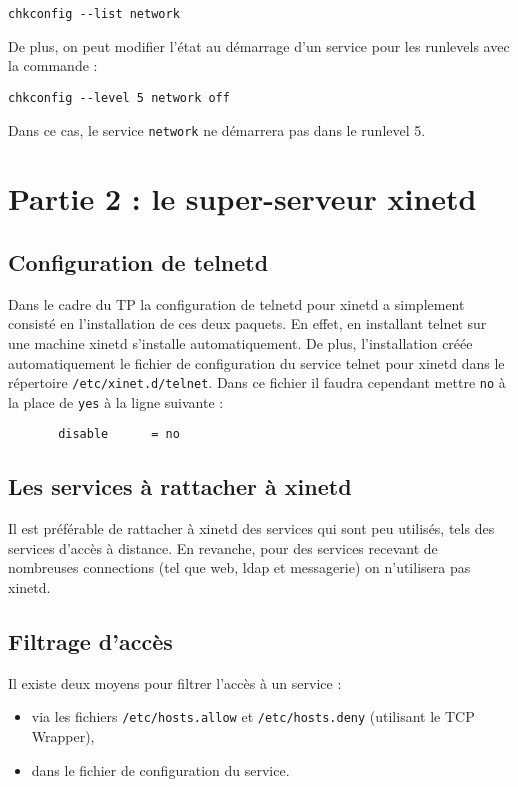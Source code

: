 \documentclass[12pt,a4paper,notitlepage]{article}
\begin{document}
\begin{lstlisting}
chkconfig --list network
\end{lstlisting}
De plus, on peut modifier l'état au démarrage d'un service pour les runlevels avec la commande :
\begin{lstlisting}
chkconfig --level 5 network off
\end{lstlisting}
Dans ce cas, le service \texttt{network} ne démarrera pas dans le runlevel 5.


\section{Partie 2 : le super-serveur xinetd}
\subsection{Configuration de telnetd}
 
Dans le cadre du TP la configuration de telnetd pour xinetd a simplement consisté en l'installation de ces deux paquets. En effet, en installant telnet sur une machine xinetd s'installe automatiquement. De plus, l'installation créée automatiquement le fichier de configuration du service telnet pour xinetd dans le répertoire \texttt{/etc/xinet.d/telnet}. Dans ce fichier il faudra cependant mettre \texttt{no} à la place de \texttt{yes} à la ligne suivante :
\begin{lstlisting}
       disable		= no
\end{lstlisting}

\subsection{Les services à rattacher à xinetd}
Il est préférable de rattacher à xinetd des services qui sont peu utilisés, tels des services d'accès à distance. En revanche, pour des services recevant de nombreuses connections (tel que web, ldap et messagerie) on n'utilisera pas xinetd.

\subsection{Filtrage d'accès}

Il existe deux moyens pour filtrer l'accès à un service : 
\begin{itemize}
\item via les fichiers \texttt{/etc/hosts.allow} et \texttt{/etc/hosts.deny} (utilisant le TCP Wrapper),
\item dans le fichier de configuration du service.
\end{itemize}
\end{document}
